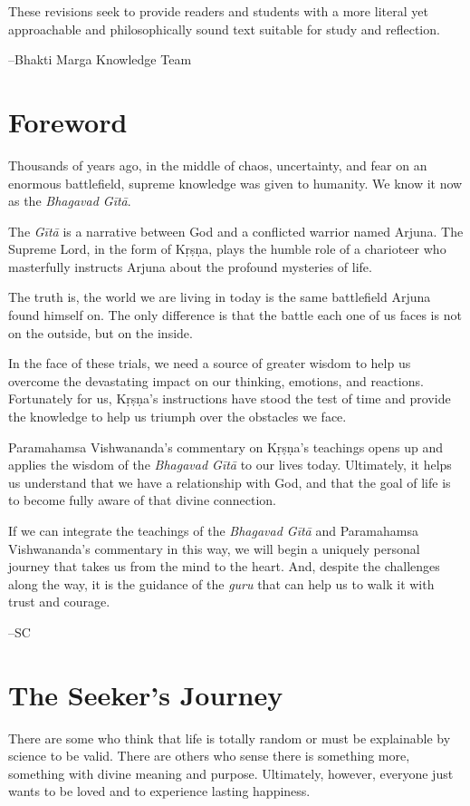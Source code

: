 \documentclass[12pt, twoside, openright]{memoir}
\begin{document}
These revisions seek to provide readers and students with a more literal yet approachable and philosophically sound 
text suitable for study and reflection. 

--Bhakti Marga Knowledge Team


 \chapter{Foreword}\label{chap-foreword}
\bigskip
 
Thousands of years ago, in the middle of chaos, uncertainty, and fear on an enormous battlefield, supreme knowledge was given to humanity. We know it now as the \textit{Bhagavad Gītā}. 

The \textit{Gītā} is a narrative between God and a conflicted warrior named Arjuna. The Supreme Lord, in the form of Kṛṣṇa, plays the humble role of a charioteer who masterfully instructs Arjuna about the profound mysteries of life. 

The truth is, the world we are living in today is the same battlefield Arjuna found himself on. The only difference is that the battle each one of us faces is not on the outside, but on the inside. 

In the face of these trials, we need a source of greater wisdom to help us overcome the devastating impact on our thinking, emotions, and reactions. Fortunately for us, Kṛṣṇa’s instructions have stood the test of time and provide the knowledge to help us triumph over the obstacles we face. 

Paramahamsa Vishwananda’s commentary on Kṛṣṇa’s teachings opens up and applies the wisdom of the \textit{Bhagavad Gītā} to our lives today. Ultimately, it helps us understand that we have a relationship with God, and that the goal of life is to become fully aware of that divine connection. 

If we can integrate the teachings of the \textit{Bhagavad Gītā} and Paramahamsa Vishwananda’s commentary in this way, we will begin a uniquely personal journey that takes us from the mind to the heart. And, despite the challenges along the way, it is the guidance of the \textit{guru} that can help us to walk it with trust and courage. 

--SC \chapter{The Seeker's Journey}\label{chap-the-seeker-s-journey}
\bigskip

There are some who think that life is totally random or must be explainable by science to be valid. There are others who sense there is something more, something with divine meaning and purpose. Ultimately, however, everyone just wants to be loved and to experience lasting happiness.
\end{document}
